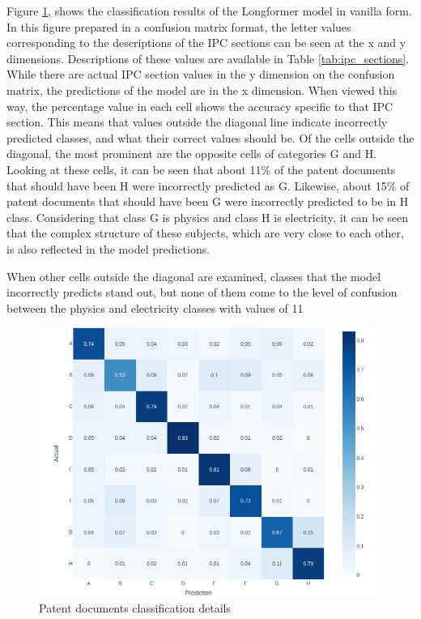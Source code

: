 \documentclass{iyte}
\begin{document}
Figure \ref{chart:confusion_matrix}, shows the classification results of the Longformer model in vanilla form. In this figure prepared in a confusion matrix format, the letter values corresponding to the descriptions of the IPC sections can be seen at the x and y dimensions. Descriptions of these values are available in Table \ref{tab:ipc_sections}. While there are actual IPC section values in the y dimension on the confusion matrix, the predictions of the model are in the x dimension. When viewed this way, the percentage value in each cell shows the accuracy specific to that IPC section. This means that values outside the diagonal line indicate incorrectly predicted classes, and what their correct values should be. Of the cells outside the diagonal, the most prominent are the opposite cells of categories G and H. Looking at these cells, it can be seen that about 11\% of the patent documents that should have been H were incorrectly predicted as G. Likewise, about 15\% of patent documents that should have been G were incorrectly predicted to be in H class. Considering that class G is physics and class H is electricity, it can be seen that the complex structure of these subjects, which are very close to each other, is also reflected in the model predictions.

When other cells outside the diagonal are examined, classes that the model incorrectly predicts stand out, but none of them come to the level of confusion between the physics and electricity classes with values of 11%

\begin{figure}[ht]
\includegraphics[width=14.5cm]{images/confusion_matrix.png}
\caption{Patent documents classification details}
\label{chart:confusion_matrix}
\end{figure}
\end{document}
